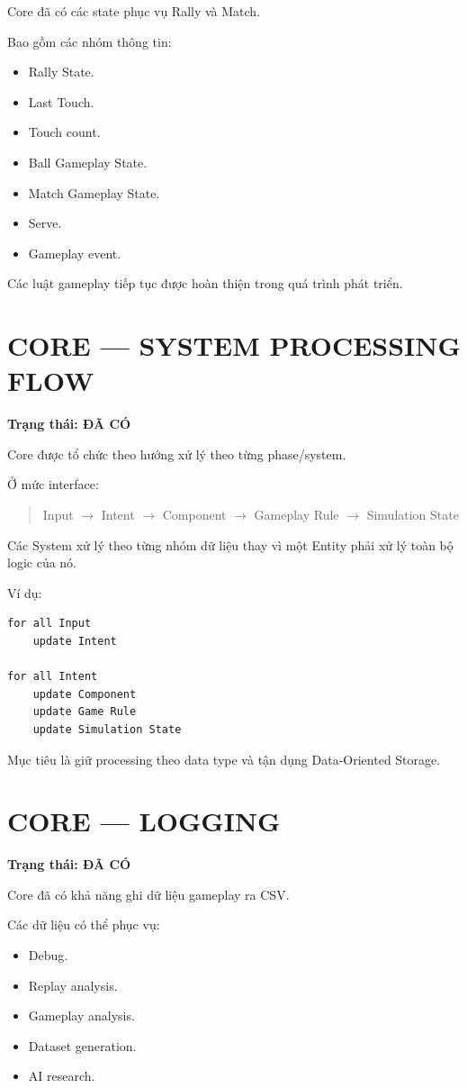 \documentclass[12pt,a4paper]{article}
\newcommand{\flow}[1]{%
  \begin{quote}\centering\ttfamily #1\end{quote}%
}
\begin{document}
Core đã có các state phục vụ Rally và Match.

Bao gồm các nhóm thông tin:
\begin{itemize}[nosep]
  \item Rally State.
  \item Last Touch.
  \item Touch count.
  \item Ball Gameplay State.
  \item Match Gameplay State.
  \item Serve.
  \item Gameplay event.
\end{itemize}

Các luật gameplay tiếp tục được hoàn thiện trong quá trình phát triển.

\section{CORE --- SYSTEM PROCESSING FLOW}
\textbf{Trạng thái: ĐÃ CÓ}

Core được tổ chức theo hướng xử lý theo từng phase/system.

Ở mức interface:

\flow{Input $\rightarrow$ Intent $\rightarrow$ Component $\rightarrow$ Gameplay Rule $\rightarrow$ Simulation State}

Các System xử lý theo từng nhóm dữ liệu thay vì một Entity phải xử lý toàn bộ logic của nó.

Ví dụ:
\begin{verbatim}
for all Input
    update Intent

for all Intent
    update Component
    update Game Rule
    update Simulation State
\end{verbatim}

Mục tiêu là giữ processing theo data type và tận dụng Data-Oriented Storage.

\section{CORE --- LOGGING}
\textbf{Trạng thái: ĐÃ CÓ}

Core đã có khả năng ghi dữ liệu gameplay ra CSV.

Các dữ liệu có thể phục vụ:
\begin{itemize}[nosep]
  \item Debug.
  \item Replay analysis.
  \item Gameplay analysis.
  \item Dataset generation.
  \item AI research.
\end{itemize}
\end{document}
